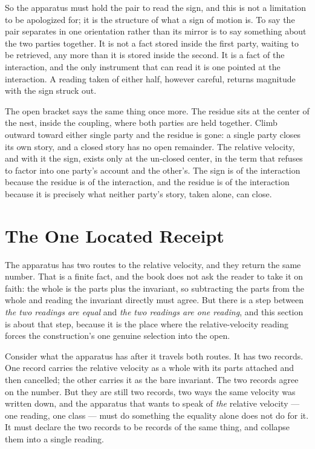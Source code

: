 So the apparatus must hold the pair to read the sign, and this is not a limitation to be
apologized for; it is the structure of what a sign of motion is. To say the pair separates in
one orientation rather than its mirror is to say something about the two parties together. It is
not a fact stored inside the first party, waiting to be retrieved, any more than it is stored
inside the second. It is a fact of the interaction, and the only instrument that can read it is
one pointed at the interaction. A reading taken of either half, however careful, returns
magnitude with the sign struck out.

The open bracket says the same thing once more. The residue sits at the center of the nest,
inside the coupling, where both parties are held together. Climb outward toward either single
party and the residue is gone: a single party closes its own story, and a closed story has no
open remainder. The relative velocity, and with it the sign, exists only at the un-closed center,
in the term that refuses to factor into one party's account and the other's. The sign is of the
interaction because the residue is of the interaction, and the residue is of the interaction
because it is precisely what neither party's story, taken alone, can close.

\section{The One Located Receipt}

The apparatus has two routes to the relative velocity, and they return the same number. That is
a finite fact, and the book does not ask the reader to take it on faith: the whole is the parts
plus the invariant, so subtracting the parts from the whole and reading the invariant directly
must agree. But there is a step between \emph{the two readings are equal} and \emph{the two
readings are one reading}, and this section is about that step, because it is the place where
the relative-velocity reading forces the construction's one genuine selection into the open.

Consider what the apparatus has after it travels both routes. It has two records. One record
carries the relative velocity as a whole with its parts attached and then cancelled; the other
carries it as the bare invariant. The two records agree on the number. But they are still two
records, two ways the same velocity was written down, and the apparatus that wants to speak of
\emph{the} relative velocity --- one reading, one class --- must do something the equality alone
does not do for it. It must declare the two records to be records of the same thing, and collapse
them into a single reading.

